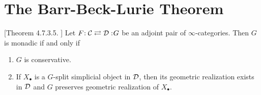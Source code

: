 

\clearpage







\section{The Barr-Beck-Lurie Theorem}
\begin{theorem}
\label{Barr-Beck-Lurie theorem}
	[Theorem 4.7.3.5. \cite{HA}]
	Let $F\negmedspace: {\mathcal{C}}\rightleftarrows {\mathcal{D}}:\negmedspace G$ be an adjoint pair of $\infty$-categories. Then $G$ is monadic if and only if 
	\begin{enumerate}
		\item $G$ is conservative.
		\item If $X_\bullet$ is a $G$-split simplicial object in ${\mathcal{D}}$, then its geometric realization exists in ${\mathcal{D}}$ and $G$ preserves geometric realization of $X_{\bullet}$.
	\end{enumerate}
\end{theorem}

